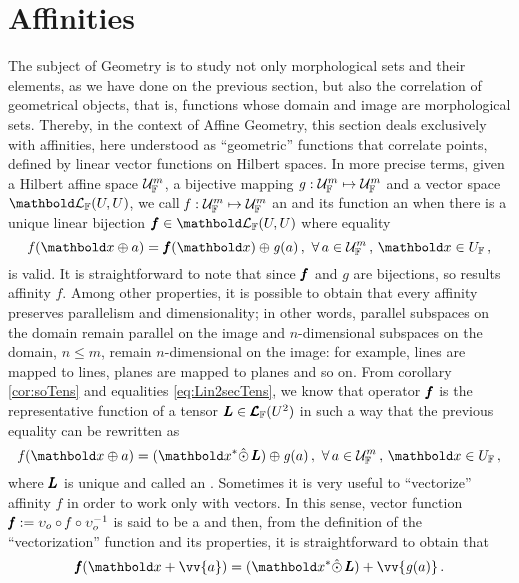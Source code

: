 \section{Affinities}
The subject of Geometry is to study not only morphological sets and their elements, as we have done on the previous section, but also the correlation of geometrical objects, that is, functions whose domain and image are morphological sets. Thereby, in the context of Affine Geometry, this section deals exclusively with affinities, here understood as ``geometric'' functions that correlate points, defined by linear vector functions on Hilbert spaces. In more precise terms, given a Hilbert affine space $\eamd{U}{F}{m}$, a bijective mapping $\map{\mathit{g}}{\eamd{U}{F}{m}}{\eamd{U}{F}{m}}$ and a vector space $\evl{\cam{F}}{U}{U}$, we call  $\map{\mathit{f}}{\eamd{U}{F}{m}}{\eamd{U}{F}{m}}$ an  and its function an  when there is a unique linear bijection $\vtf{f}\in\evl{\cam{F}}{U}{U}$ where equality
\begin{equation}\label{eq:affty}
\fua{\mathit{f}}{\vto{x}\oplus a}=\fua{\vtf{f}}{\vto{x}}\oplus\fua{\mathit{g}}{a}\,,\,\,\forall\,a\in\eamd{U}{F}{m}\,,\,\vto{x}\in U_\cam{F}\,,
\end{equation}
is valid. It is straightforward to note that since $\vtf{f}$ and $\mathit{g}$ are bijections, so results affinity $\mathit{f}$. Among other properties, it is possible to obtain that every affinity preserves parallelism and dimensionality; in other words, parallel subspaces on the  domain remain parallel on the image and $n$-dimensional subspaces on the domain, $n\leq m$, remain $n$-dimensional on the image: for example, lines are mapped to lines, planes are mapped to planes and so on. From corollary \ref{cor:soTens} and equalities \eqref{eq:Lin2secTens}, we know that operator $\vtf{f}$ is the representative function of a tensor $\tnr{L}\in\ete{\cam{F}}{U^2}$ in such a way that the previous equality can be rewritten as
\begin{equation}\label{eq:afftyT}
\fua{\mathit{f}}{\vto{x}\oplus a}=(\vto{x}^*\hat{\odot}\,\tnr{L})\oplus\fua{\mathit{g}}{a}\,,\,\,\forall\,a\in\eamd{U}{F}{m}\,,\,\vto{x}\in U_\cam{F}\,,
\end{equation}
where $\tnr{L}$ is unique and called an . Sometimes it is very useful to ``vectorize'' affinity $\mathit{f}$ in order to work only with vectors. In this sense, vector function $\tnr{\mathit{f}}:= \upsilon_o\circ\mathit{f}\circ\upsilon_o^{-1}$ is said to be a  and then, from the definition of the ``vectorization'' function and its properties, it is straightforward to obtain that 
\begin{equation}\label{eq:vecAffi}
\fua{\tnr{\mathit{f}}}{\vto{x}+ \vv{a}}=(\vto{x}^*\hat{\odot}\,\tnr{L})+\vv{\fua{\mathit{g}}{a}}\,.
\end{equation}

